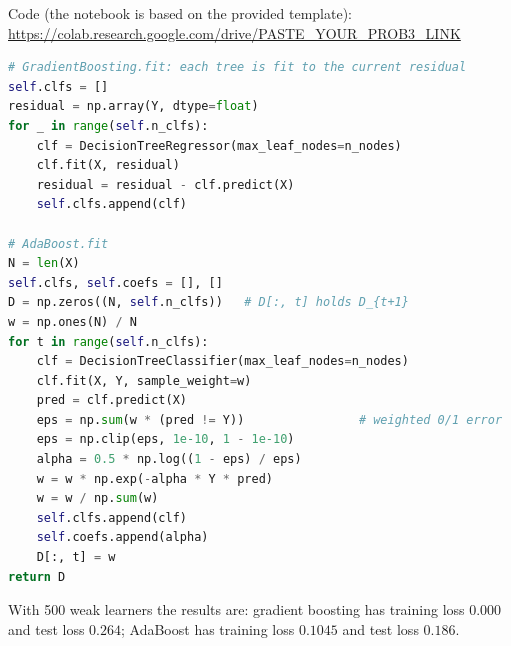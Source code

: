 \documentclass{article}
\begin{document}
\begin{solution}
\upshape
Code (the notebook is based on the provided template): \url{https://colab.research.google.com/drive/PASTE_YOUR_PROB3_LINK}

\begin{lstlisting}[language=Python, basicstyle=\ttfamily\footnotesize, breaklines=true, frame=single]
# GradientBoosting.fit: each tree is fit to the current residual
self.clfs = []
residual = np.array(Y, dtype=float)
for _ in range(self.n_clfs):
    clf = DecisionTreeRegressor(max_leaf_nodes=n_nodes)
    clf.fit(X, residual)
    residual = residual - clf.predict(X)
    self.clfs.append(clf)

# AdaBoost.fit
N = len(X)
self.clfs, self.coefs = [], []
D = np.zeros((N, self.n_clfs))   # D[:, t] holds D_{t+1}
w = np.ones(N) / N
for t in range(self.n_clfs):
    clf = DecisionTreeClassifier(max_leaf_nodes=n_nodes)
    clf.fit(X, Y, sample_weight=w)
    pred = clf.predict(X)
    eps = np.sum(w * (pred != Y))                # weighted 0/1 error
    eps = np.clip(eps, 1e-10, 1 - 1e-10)
    alpha = 0.5 * np.log((1 - eps) / eps)
    w = w * np.exp(-alpha * Y * pred)
    w = w / np.sum(w)
    self.clfs.append(clf)
    self.coefs.append(alpha)
    D[:, t] = w
return D
\end{lstlisting}

With 500 weak learners the results are: gradient boosting has training loss $0.000$ and test loss $0.264$; AdaBoost has training loss $0.1045$ and test loss $0.186$.
\end{solution}
\end{document}
